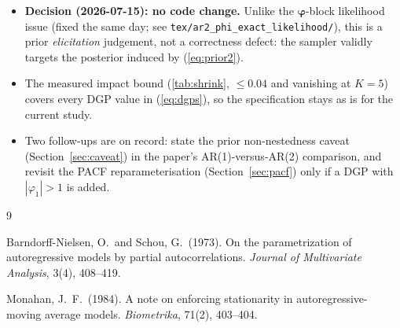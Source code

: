 \documentclass[11pt]{article}
\newcommand{\eref}[1]{(\ref{#1})}
\newcommand{\sref}[1]{Section~\ref{#1}}
\newcommand{\bphi}{\boldsymbol{\varphi}}
\theoremstyle{plain}
\theoremstyle{definition}
\theoremstyle{remark}
\begin{document}
\begin{itemize}
  \item \textbf{Decision (2026-07-15): no code change.} Unlike the
        $\bphi$-block likelihood issue (fixed the same day; see
        \texttt{tex/ar2\_phi\_exact\_likelihood/}), this is a prior
        \emph{elicitation} judgement, not a correctness defect: the sampler
        validly targets the posterior induced by \eref{eq:prior2}.
  \item The measured impact bound (\cref{tab:shrink}, $\leq 0.04$ and
        vanishing at $K = 5$) covers every DGP value in \eref{eq:dgps}, so
        the specification stays as is for the current study.
  \item Two follow-ups are on record: state the prior non-nestedness caveat
        (\sref{sec:caveat}) in the paper's AR(1)-versus-AR(2) comparison,
        and revisit the PACF reparameterisation (\sref{sec:pacf}) only if a
        DGP with $|\varphi_1| > 1$ is added.
\end{itemize}

\begin{thebibliography}{9}

Barndorff-Nielsen, O.\ and Schou, G.\ (1973).
On the parametrization of autoregressive models by partial autocorrelations.
\emph{Journal of Multivariate Analysis}, 3(4), 408--419.

Monahan, J.~F.\ (1984).
A note on enforcing stationarity in autoregressive-moving average models.
\emph{Biometrika}, 71(2), 403--404.

\end{thebibliography}
\end{document}
